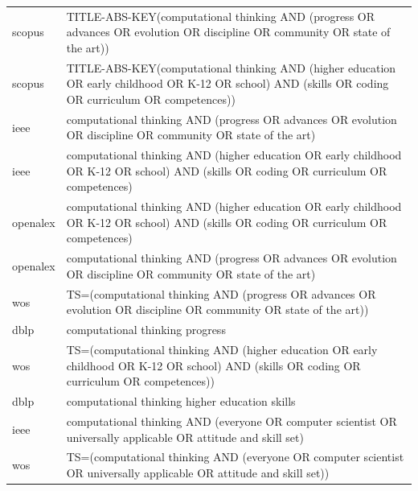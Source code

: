 \documentclass{article}
\begin{document}
\begin{longtable}{lp{10cm}}
scopus & TITLE-ABS-KEY(\textquotedbl{}computational thinking\textquotedbl{} AND (progress OR advances OR evolution OR discipline OR community OR \textquotedbl{}state of the art\textquotedbl{})) \\
scopus & TITLE-ABS-KEY(\textquotedbl{}computational thinking\textquotedbl{} AND (\textquotedbl{}higher education\textquotedbl{} OR \textquotedbl{}early childhood\textquotedbl{} OR K-12 OR school) AND (skills OR coding OR curriculum OR competences)) \\
ieee & \textquotedbl{}computational thinking\textquotedbl{} AND (progress OR advances OR evolution OR discipline OR community OR \textquotedbl{}state of the art\textquotedbl{}) \\
ieee & \textquotedbl{}computational thinking\textquotedbl{} AND (\textquotedbl{}higher education\textquotedbl{} OR \textquotedbl{}early childhood\textquotedbl{} OR K-12 OR school) AND (skills OR coding OR curriculum OR competences) \\
openalex & \textquotedbl{}computational thinking\textquotedbl{} AND (\textquotedbl{}higher education\textquotedbl{} OR \textquotedbl{}early childhood\textquotedbl{} OR K-12 OR school) AND (skills OR coding OR curriculum OR competences) \\
openalex & \textquotedbl{}computational thinking\textquotedbl{} AND (progress OR advances OR evolution OR discipline OR community OR \textquotedbl{}state of the art\textquotedbl{}) \\
wos & TS=(\textquotedbl{}computational thinking\textquotedbl{} AND (progress OR advances OR evolution OR discipline OR community OR \textquotedbl{}state of the art\textquotedbl{})) \\
dblp & computational thinking progress \\
wos & TS=(\textquotedbl{}computational thinking\textquotedbl{} AND (\textquotedbl{}higher education\textquotedbl{} OR \textquotedbl{}early childhood\textquotedbl{} OR K-12 OR school) AND (skills OR coding OR curriculum OR competences)) \\
dblp & computational thinking higher education skills \\
ieee & \textquotedbl{}computational thinking\textquotedbl{} AND (everyone OR \textquotedbl{}computer scientist\textquotedbl{} OR \textquotedbl{}universally applicable\textquotedbl{} OR \textquotedbl{}attitude and skill set\textquotedbl{}) \\
wos & TS=(\textquotedbl{}computational thinking\textquotedbl{} AND (everyone OR \textquotedbl{}computer scientist\textquotedbl{} OR \textquotedbl{}universally applicable\textquotedbl{} OR \textquotedbl{}attitude and skill set\textquotedbl{})) \\

\end{longtable}
\end{document}
